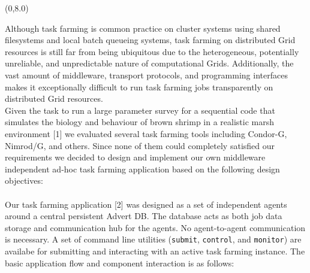 \documentclass[a0b,portrait]{a0poster}
\def\LHead#1{\bigskip\bigskip\noindent{\huge\color{HeadColor} #1}\smallskip}
\begin{document}
\begin{textblock}{7}(0,8.0)
  \LHead{Introduction}
  
  \large 
Although task farming is common practice on cluster systems using shared 
filesystems and local batch queueing systems, task farming on distributed Grid 
resources is still far from being ubiquitous due to the heterogeneous, 
potentially unreliable, and unpredictable nature of computational Grids. 
Additionally, the vast amount of middleware, transport protocols, and 
programming interfaces makes it exceptionally difficult to run task farming jobs 
transparently on distributed Grid resources.\\[0.4em]
Given the task to run a large parameter survey for a sequential code that 
simulates the biology and behaviour of brown shrimp in a realistic marsh 
environment [1] we evaluated several task farming tools including Condor-G, 
Nimrod/G, and others. Since none of them could completely satisfied our 
requirements we decided to design and implement our own middleware independent 
ad-hoc task farming application based on the following design objectives:\\[3.6em]



\LHead{Implementation}\\[.4em]
Our task farming application [2] was designed as a set of independent agents 
around a central persistent Advert DB. The database acts as both job data storage
and communication hub for the agents. No agent-to-agent communication is 
necessary. A set of command line utilities (\texttt{submit}, \texttt{control}, 
and \texttt{monitor}) are availabe for submitting and interacting with an active 
task farming instance. The basic application flow and component interaction is 
as follows:\\ 


\end{textblock}
\end{document}
